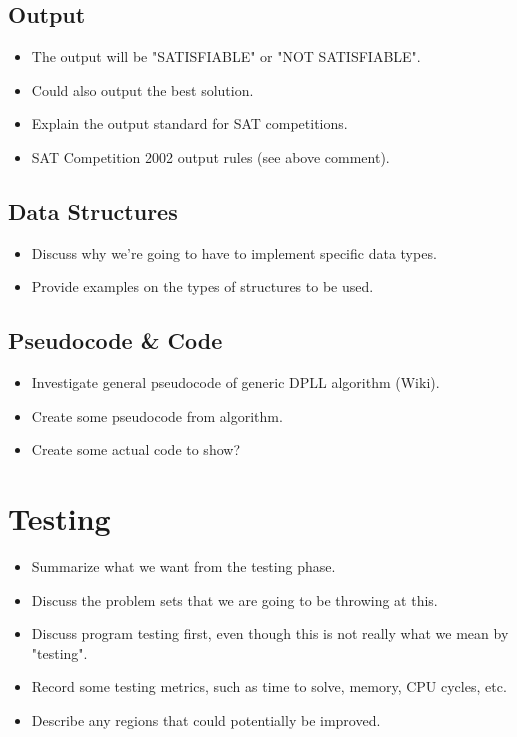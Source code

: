 \documentclass{article}
\begin{document}
\subsection{Output}
\begin{itemize}
    \item The output will be "SATISFIABLE" or "NOT SATISFIABLE".
    \item Could also output the best solution.
    \item Explain the output standard for SAT competitions.
    \item SAT Competition 2002 output rules (see above comment).
\end{itemize}

\subsection{Data Structures}
\begin{itemize}
    \item Discuss why we're going to have to implement specific data types.
    \item Provide examples on the types of structures to be used.
\end{itemize}

\subsection{Pseudocode \& Code}
\begin{itemize}
    \item Investigate general pseudocode of generic DPLL algorithm (Wiki).
    \item Create some pseudocode from algorithm.
    \item Create some actual code to show?
\end{itemize}

\section{Testing}
\begin{itemize}
    \item Summarize what we want from the testing phase.
    \item Discuss the problem sets that we are going to be throwing at this.
    \item Discuss program testing first, even though this is not really what we mean by "testing".
    \item Record some testing metrics, such as time to solve, memory, CPU cycles, etc.
    \item Describe any regions that could potentially be improved.
\end{itemize}
\end{document}
